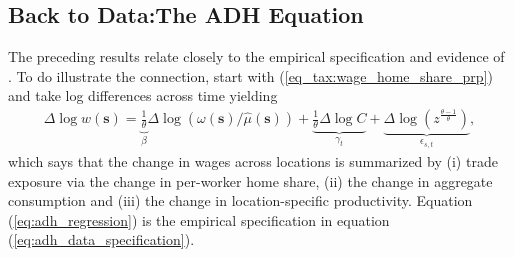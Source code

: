 \documentclass[pdftex,12pt]{article}
\begin{document}
\subsection{Back to Data:The ADH Equation}

\medskip
\noindent The preceding results relate closely to the empirical specification and evidence of \citet{david2013china}. To do illustrate the connection, start with (\ref{eq_tax:wage_home_share_prp}) and take log differences across time yielding
\begin{align}
 \Delta \log w(\textbf{s}) =  \underbrace{\frac{1}{\theta}}_{\beta}\Delta \log \left( \omega(\textbf{s})/\hat \mu( \textbf{s})\right) +  \underbrace{\frac{1}{\theta}\Delta \log C}_{\gamma_t} + \underbrace{\Delta \log \left(z^{\frac{\theta-1}{\theta}}\right)}_{\epsilon_{s,t}},
\label{eq:adh_regression}
\end{align}
which says that the change in wages across locations is summarized by (i) trade exposure via the change in per-worker home share, (ii) the change in aggregate consumption and (iii) the change in location-specific productivity. Equation (\ref{eq:adh_regression}) is the empirical specification in equation (\ref{eq:adh_data_specification}).
\end{document}

